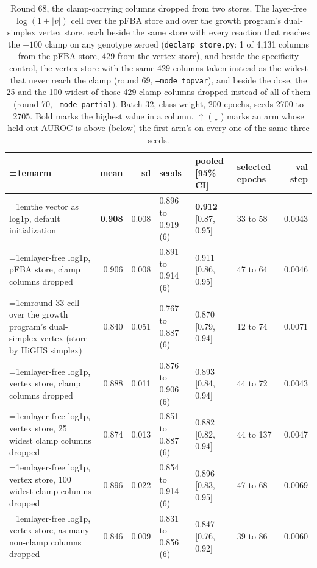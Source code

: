 \begin{table}[H]
  \centering
  \scriptsize
  \setlength{\tabcolsep}{2.5pt}
  \caption[Round 68, the clamp-carrying columns dropped from two stores]{Round 68, the clamp-carrying columns dropped from two stores. The layer-free $\log(1 + |v|)$ cell over the pFBA store and over the growth program's dual-simplex vertex store, each beside the same store with every reaction that reaches the $\pm100$ clamp on any genotype zeroed (\texttt{declamp\_store.py}: 1 of 4,131 columns from the pFBA store, 429 from the vertex store), and beside the specificity control, the vertex store with the same 429 columns taken instead as the widest that never reach the clamp (round 69, \texttt{--mode topvar}), and beside the dose, the 25 and the 100 widest of those 429 clamp columns dropped instead of all of them (round 70, \texttt{--mode partial}). Batch 32, class weight, 200 epochs, seeds 2700 to 2705. Bold marks the highest value in a column. $\uparrow$ ($\downarrow$) marks an arm whose held-out AUROC is above (below) the first arm's on every one of the same three seeds.}
  \label{tab:w84}
  \begin{tabular}{@{}>{\raggedright\hangindent=1em\hangafter=1\arraybackslash}p{84.4mm}rrlllr@{}}
    \hline
    arm & mean & sd & seeds & pooled [95\% CI] & selected epochs & val step \\
    \hline
    the vector as log1p, default initialization & \textbf{0.908} & 0.008 & 0.896 to 0.919 (6) & \textbf{0.912} [0.87, 0.95] & 33 to 58 & 0.0043 \\
    layer-free log1p, pFBA store, clamp columns dropped & 0.906 & 0.008 & 0.891 to 0.914 (6) & 0.911 [0.86, 0.95] & 47 to 64 & 0.0046 \\
    round-33 cell over the growth program's dual-simplex vertex (store by HiGHS simplex) & 0.840 & 0.051 & 0.767 to 0.887 (6) & 0.870 [0.79, 0.94] & 12 to 74 & 0.0071 \\
    layer-free log1p, vertex store, clamp columns dropped & 0.888 & 0.011 & 0.876 to 0.906 (6) & 0.893 [0.84, 0.94] & 44 to 72 & 0.0043 \\
    layer-free log1p, vertex store, 25 widest clamp columns dropped & 0.874 & 0.013 & 0.851 to 0.887 (6) & 0.882 [0.82, 0.94] & 44 to 137 & 0.0047 \\
    layer-free log1p, vertex store, 100 widest clamp columns dropped & 0.896 & 0.022 & 0.854 to 0.914 (6) & 0.896 [0.83, 0.95] & 47 to 68 & 0.0069 \\
    layer-free log1p, vertex store, as many non-clamp columns dropped & 0.846 & 0.009 & 0.831 to 0.856 (6) & 0.847 [0.76, 0.92] & 39 to 86 & 0.0060 \\
    \hline
  \end{tabular}
\end{table}
